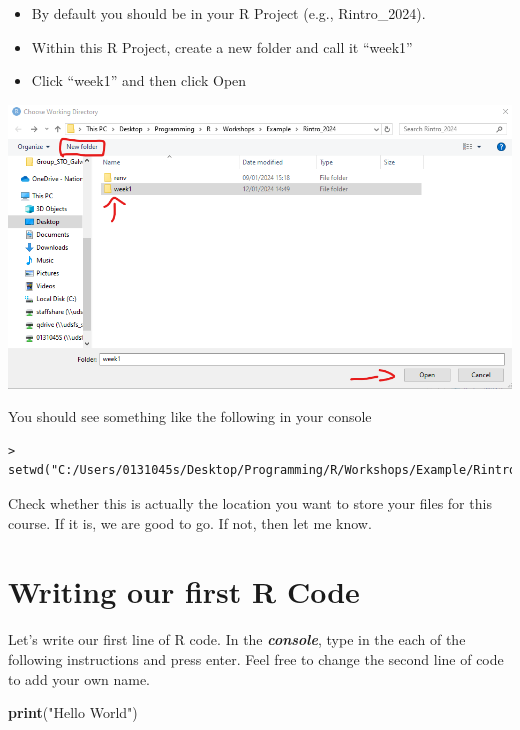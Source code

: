 \documentclass[
]{book}
\newenvironment{Shaded}{\begin{snugshade}}{\end{snugshade}}
\newcommand{\FunctionTok}[1]{\textcolor[rgb]{0.13,0.29,0.53}{\textbf{#1}}}
\newcommand{\NormalTok}[1]{#1}
\newcommand{\StringTok}[1]{\textcolor[rgb]{0.31,0.60,0.02}{#1}}
\begin{document}
\begin{itemize}
\item
  By default you should be in your R Project (e.g., Rintro\_2024).
\item
  Within this R Project, create a new folder and call it ``week1''
\item
  Click ``week1'' and then click Open
\end{itemize}

\includegraphics{img/01-new_wd.png}

You should see something like the following in your console

\begin{verbatim}
> setwd("C:/Users/0131045s/Desktop/Programming/R/Workshops/Example/Rintro_2024/week1")
\end{verbatim}

Check whether this is actually the location you want to store your files for this course. If it is, we are good to go. If not, then let me know.

\hypertarget{writing-our-first-r-code}{%
\section{Writing our first R Code}\label{writing-our-first-r-code}}

Let's write our first line of R code. In the \textbf{\emph{console}}, type in the each of the following instructions and press enter. Feel free to change the second line of code to add your own name.

\begin{Shaded}
\begin{Highlighting}[]
\FunctionTok{print}\NormalTok{(}\StringTok{"Hello World"}\NormalTok{)}
\end{Highlighting}
\end{Shaded}
\end{document}
